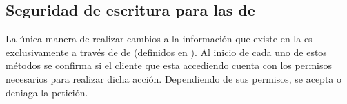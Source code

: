

\subsection{Seguridad de escritura para las \collectionsname de \mongodbNAME}

	La única manera de realizar cambios  a la información que existe en la \dataBasesDB es exclusivamente a través de \methodsMETEOR de \meteorNAME (definidos en ). Al inicio de cada uno de estos métodos se confirma si el cliente que esta accediendo cuenta con los permisos necesarios para realizar dicha acción. Dependiendo de sus permisos, se acepta o deniaga la petición.





